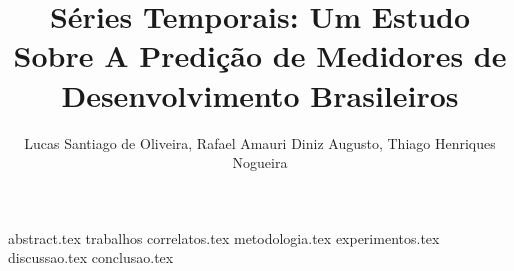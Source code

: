 \documentclass{article}
\title{Séries Temporais: Um Estudo Sobre A Predição de Medidores de Desenvolvimento Brasileiros}
\author{Lucas Santiago de Oliveira\inst{1}, Rafael Amauri Diniz Augusto\inst{1}, Thiago Henriques Nogueira\inst{1}}
\begin{document}
  \maketitle

  {abstract.tex}
  {trabalhos correlatos.tex}
  {metodologia.tex}
  {experimentos.tex}
  {discussao.tex}
  {conclusao.tex}

  
  
\end{document}
